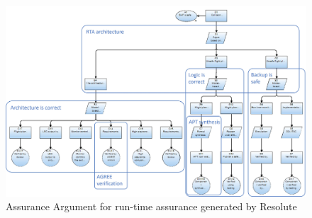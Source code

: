 \begin{figure}
	\centering
	\includegraphics[width=\textwidth]{figures/rta-resolute.jpg}
	\caption{Assurance Argument for run-time assurance generated by Resolute}
	\label{fig:rta-resolute}
\end{figure}
